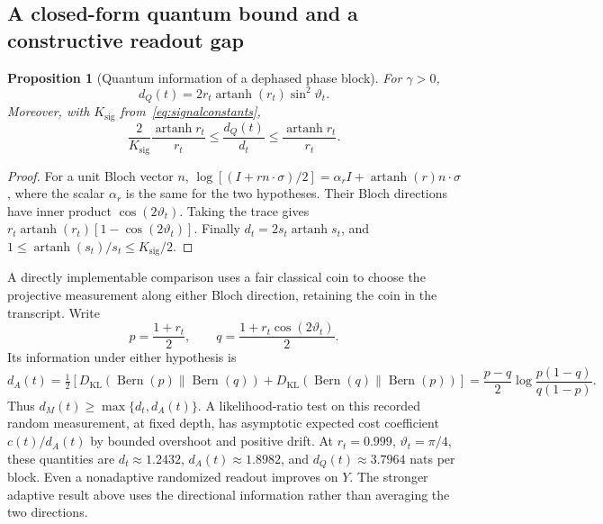 \documentclass[11pt,a4paper]{article}
\newtheorem{proposition}[theorem]{Proposition}
\theoremstyle{definition}
\theoremstyle{remark}
\numberwithin{equation}{section}
\begin{document}
\subsection{A closed-form quantum bound and a constructive readout gap}
\begin{proposition}[Quantum information of a dephased phase block]\label{prop:qentropy}
For $\gamma>0$,
\begin{equation}\label{eq:qentropy}
 d_Q(t)=2r_t\operatorname{artanh}(r_t)\sin^2\vartheta_t.
\end{equation}
Moreover, with $K_{\mathrm{sig}}$ from~\eqref{eq:signalconstants},
\begin{equation}\label{eq:pointwisegap}
 \frac{2}{K_{\mathrm{sig}}}\frac{\operatorname{artanh}r_t}{r_t}
 \leq\frac{d_Q(t)}{d_t}
 \leq\frac{\operatorname{artanh}r_t}{r_t}.
\end{equation}
\end{proposition}
\begin{proof}
For a unit Bloch vector $n$,
$\log[(I+rn\cdot\sigma)/2]=\alpha_r I+
\operatorname{artanh}(r)n\cdot\sigma$, where the scalar $\alpha_r$
is the same for the two hypotheses. Their Bloch directions have inner
product $\cos(2\vartheta_t)$. Taking the trace gives
$r_t\operatorname{artanh}(r_t)[1-\cos(2\vartheta_t)]$.
Finally $d_t=2s_t\operatorname{artanh}s_t$, and
$1\leq\operatorname{artanh}(s_t)/s_t\leq K_{\mathrm{sig}}/2$.
\end{proof}

A directly implementable comparison uses a fair classical coin to choose
the projective measurement along either Bloch direction, retaining the
coin in the transcript. Write
\[
 p=\frac{1+r_t}{2},\qquad
 q=\frac{1+r_t\cos(2\vartheta_t)}{2}.
\]
Its information under either hypothesis is
\begin{equation}\label{eq:axisinfo}
 d_A(t)=\tfrac12[D_{\mathrm{KL}}(\operatorname{Bern}(p)\|
 \operatorname{Bern}(q))+D_{\mathrm{KL}}(\operatorname{Bern}(q)\|
 \operatorname{Bern}(p))]
 =\frac{p-q}{2}\log\frac{p(1-q)}{q(1-p)}.
\end{equation}
Thus $d_M(t)\geq\max\{d_t,d_A(t)\}$. A likelihood-ratio test on this
recorded random measurement, at fixed depth, has asymptotic expected
cost coefficient $c(t)/d_A(t)$ by bounded overshoot and positive drift.
At $r_t=0.999$, $\vartheta_t=\pi/4$, these quantities are
$d_t\approx1.2432$, $d_A(t)\approx1.8982$, and $d_Q(t)\approx3.7964$
nats per block. Even a nonadaptive randomized readout improves on $Y$.
The stronger adaptive result above uses the directional information rather
than averaging the two directions.
\end{document}
